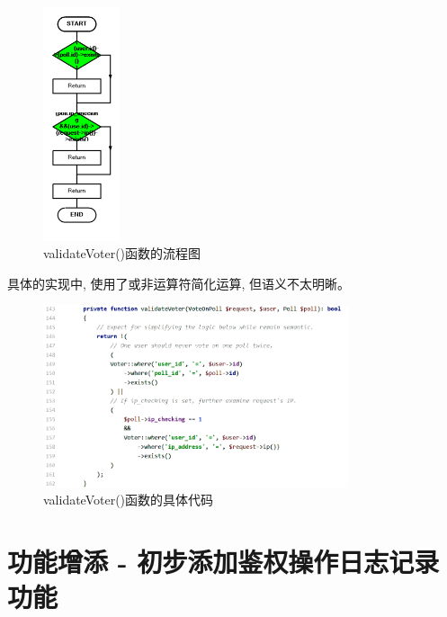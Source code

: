 \begin{figure}[hb]
    \centering
    \includegraphics[width=0.2\textwidth]{support-files/4.5.2-validate-voter-flowchart.png}
    \caption{validateVoter()函数的流程图}
    \label{fig:validatevoterchart}
\end{figure}


具体的实现中, 使用了或非运算符简化运算, 但语义不太明晰。

\begin{figure}[h]
    \centering
    \includegraphics[width=0.8\textwidth]{support-files/4.5.2-validate-voter-code.png}
    \caption{validateVoter()函数的具体代码}
    \label{fig:validatevotercode}
\end{figure}



\section{功能增添 - 初步添加鉴权操作日志记录功能}

